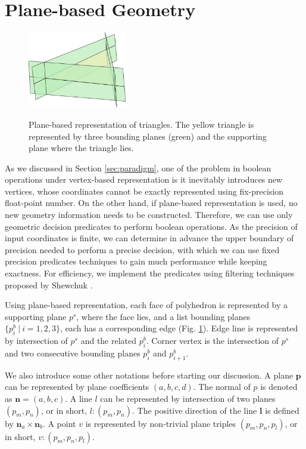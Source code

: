 \documentclass[10pt,journal,compsoc]{IEEEtran}
\begin{document}
\section{Plane-based Geometry}

\begin{figure}
  \centering
  \includegraphics[width=1.7in]{p-reps}\\
  \caption{Plane-based representation of triangles. The yellow triangle is represented by three bounding planes (green) and the supporting plane where the triangle lies.}\label{fig:p-reps}
\end{figure}

As we discussed in Section \ref{sec:paradigm}, one of the problem in boolean operations under vertex-based representation is it inevitably introduces new vertices, whose coordinates cannot be exactly represented using fix-precision float-point number. On the other hand, if plane-based representation is used, no new geometry information needs to be constructed. Therefore, we can use only geometric decision predicates to perform boolean operations. As the precision of input coordinates is finite, we can determine in advance the upper boundary of precision needed to perform a precise decision, with which we can use fixed precision predicates techniques to gain much performance while keeping exactness. For efficiency, we implement the predicates using filtering techniques proposed by Shewchuk \cite{shewchuk1997adaptive}.

Using plane-based representation, each face of polyhedron is represented by a supporting plane $p^s$, where the face lies, and a list bounding planes $\{p^b_i \ \vert\  i = 1, 2, 3\}$, each has a corresponding edge (Fig. \ref{fig:p-reps}). Edge line is represented by intersection of $p^s$ and the related $p^b_i$. Corner vertex is the intersection of $p^s$ and two consecutive bounding planes $p^b_i$ and $p^b_{i+1}$.

We also introduce some other notations before starting our discussion. A plane $\bm{p}$ can be represented by plane coefficients $(a, b, c, d)$. The normal of $p$ is denoted as $\bm{n}=(a,b,c)$. A line $l$ can be represented by intersection of two planes $(p_m, p_n)$, or in short, $l\colon(p_m, p_n)$. The positive direction of the line $\bm{l}$ is defined by $\bm{n}_a\times\bm{n}_b$. A point $v$ is represented by non-trivial plane triples $(p_m, p_n, p_l)$, or in short, $v\colon(p_m, p_n, p_l)$.
\end{document}
